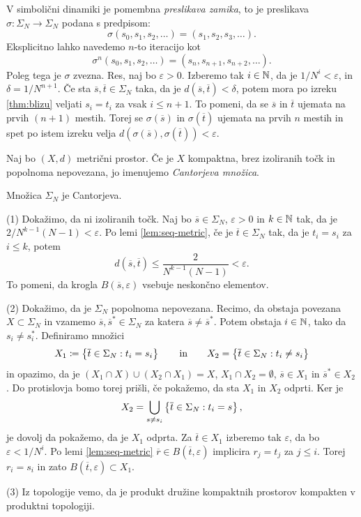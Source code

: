 V simbolični dinamiki je pomembna \emph{preslikava zamika}, to je preslikava \(\sigma \colon \Sigma_N \to \Sigma_N\) podana s predpisom:
\[\sigma (s_0, s_1, s_2, \dots) = (s_1, s_2, s_3, \dots).\]
Eksplicitno lahko navedemo \(n\)-to iteracijo kot
\[\sigma^n (s_0, s_1, s_2, \dots) = (s_n, s_{n + 1}, s_{n + 2}, \dots).\]
Poleg tega je \(\sigma\) zvezna. Res, naj bo \(\varepsilon > 0\). Izberemo tak \(i \in \mathbb N\), da je \(1 / N^i < \varepsilon\), in \(\delta = 1 / N^{n + 1}\). Če sta \(\overline{s}, \overline{t} \in \Sigma_N\) taka, da je \(d(\overline{s}, \overline{t}) < \delta\), potem mora po izreku \ref{thm:blizu} veljati \(s_i = t_i\) za vsak \(i \leq n + 1\). To pomeni, da se \(\overline{s}\) in \(\overline{t}\) ujemata na prvih \((n + 1)\) mestih. Torej se \(\sigma (\overline{s})\) in \(\sigma (\overline{t})\) ujemata na prvih \(n\) mestih in spet po istem izreku velja \(d (\sigma (\overline{s}), \sigma (\overline{t})) < \varepsilon\).

\begin{definicija}
    Naj bo \((X, d)\) metrični prostor. Če je \(X\) kompaktna, brez izoliranih točk in popolnoma nepovezana, jo imenujemo \emph{Cantorjeva množica}.
\end{definicija}

\begin{trditev}
    Množica \(\Sigma_N\) je Cantorjeva.
\end{trditev}

\begin{dokaz}
    (1) Dokažimo, da ni izoliranih točk. Naj bo \(\overline{s} \in \Sigma_N\), \(\varepsilon > 0\) in \(k \in \mathbb N\) tak, da je \(2/N^{k - 1} (N -1) < \varepsilon\). Po lemi \ref{lem:seq-metric}, če je \(\overline{t} \in \Sigma_N\) tak, da je \(t_i = s_i\) za \(i \leq k\), potem
    \[d (\overline{s}, \overline{t}) \leq \frac{2}{N^{k - 1} (N - 1)} < \varepsilon.\]
    To pomeni, da krogla \(B (\overline{s}, \varepsilon)\) vsebuje neskončno elementov.

    (2) Dokažimo, da je \(\Sigma_N\) popolnoma nepovezana. Recimo, da obstaja povezana \(X \subset \Sigma_N\) in vzamemo \(\overline{s}, \overline{s}^* \in \Sigma_N\) za katera \(\overline{s} \neq \overline{s}^*\). Potem obstaja \(i \in \mathbb N\), tako da \(s_i \neq s_i^*\). Definiramo množici
    \[X_1 \coloneq \left\{ \overline{t} \in \Sigma_N : t_i = s_i \right\} \qquad \text{in} \qquad X_2 = \left\{ \overline{t} \in \Sigma_N : t_i \neq s_i \right\}\]
    in opazimo, da je \((X_1 \cap X) \cup (X_2 \cap X_1) = X\), \(X_1 \cap X_2 = \emptyset\), \(\overline{s} \in X_1\) in \(\overline{s}^* \in X_2\). Do protislovja bomo torej prišli, če pokažemo, da sta \(X_1\) in \(X_2\) odprti. Ker je
    \[X_2 = \bigcup_{s \neq s_i} \left\{ \overline{t} \in \Sigma_N : t_i = s \right\},\]
    je dovolj da pokažemo, da je \(X_1\) odprta. Za \(\overline{t} \in X_1\) izberemo tak \(\varepsilon\), da bo \(\varepsilon < 1 / N^i\). Po lemi \ref{lem:seq-metric} \(\overline{r} \in B (\overline{t}, \varepsilon)\) implicira \(r_j = t_j\) za \(j \leq i\). Torej \(r_i = s_i\) in zato \(B (\overline{t}, \varepsilon) \subset X_1\).

    (3) Iz topologije vemo, da je produkt družine kompaktnih prostorov kompakten v produktni topologiji.
\end{dokaz}


